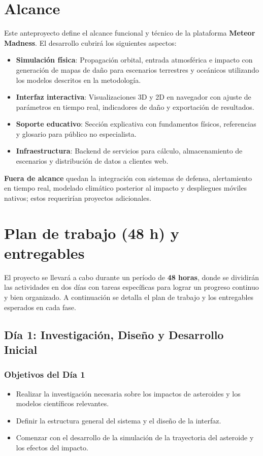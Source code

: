 \documentclass[conference]{IEEEtran}
\begin{document}
\section{Alcance}
Este anteproyecto define el alcance funcional y técnico de la plataforma
\textbf{Meteor Madness}. El desarrollo cubrirá los siguientes aspectos:
\begin{itemize}
	\item \textbf{Simulación física}: Propagación orbital, entrada atmosférica e
	      impacto con generación de mapas de daño para escenarios terrestres y
	      oceánicos utilizando los modelos descritos en la metodología.
	\item \textbf{Interfaz interactiva}: Visualizaciones 3D y 2D en navegador con
	      ajuste de parámetros en tiempo real, indicadores de daño y exportación de
	      resultados.
	\item \textbf{Soporte educativo}: Sección explicativa con fundamentos físicos,
	      referencias y glosario para público no especialista.
	\item \textbf{Infraestructura}: Backend de servicios para cálculo, almacenamiento
	      de escenarios y distribución de datos a clientes web.
\end{itemize}
\textbf{Fuera de alcance} quedan la integración con sistemas de defensa,
alertamiento en tiempo real, modelado climático posterior al impacto y
despliegues móviles nativos; estos requerirían proyectos adicionales.

\section{Plan de trabajo (48 h) y entregables}
El proyecto se llevará a cabo durante un período de \textbf{48 horas}, donde se
dividirán las actividades en dos días con tareas específicas para lograr un
progreso continuo y bien organizado. A continuación se detalla el plan de
trabajo y los entregables esperados en cada fase.
\subsection{Día 1: Investigación, Diseño y Desarrollo Inicial}
\subsubsection*{Objetivos del Día 1}
\begin{itemize}
	\item Realizar la investigación necesaria sobre los impactos de asteroides y
	      los modelos científicos relevantes.
	\item Definir la estructura general del sistema y el diseño de la interfaz.
	\item Comenzar con el desarrollo de la simulación de la trayectoria del
	      asteroide y los efectos del impacto.
\end{itemize}
\end{document}
